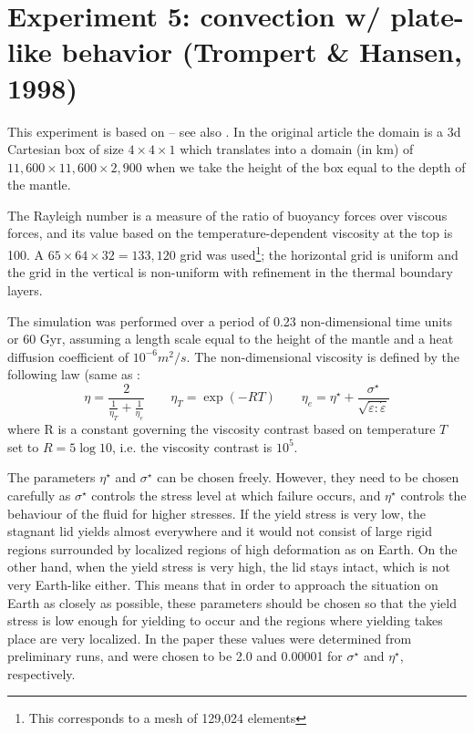 \section{Experiment 5: convection w/ plate-like behavior (Trompert \& Hansen, 1998)}

This experiment is based on \textcite{trha98b} -- see also \textcite{trha98}.
In the original article the domain is a 3d Cartesian box of size $4 \times 4 \times 1$
which translates into a domain (in km) of $11,600 \times  11,600 \times 2,900$ 
when we take the height of the box equal to the depth of the mantle.

The Rayleigh number is a measure of the ratio of buoyancy forces over viscous forces, 
and its value based on the temperature-dependent viscosity at the top is 100. A
$65 \times  64 \times  32 = 133,120$ grid was used\footnote{This corresponds to a
mesh of 129,024 elements}; the horizontal grid is uniform and the grid in the vertical 
is non-uniform with refinement in the thermal boundary layers.

The simulation was performed over a period of 0.23 non-dimensional time units or 60 Gyr, assuming a
length scale equal to the height of the mantle and a heat diffusion coefficient of $10^{-6} m^2/s$.
The non-dimensional viscosity is defined by the following law (same as \cite{tosn15}:
\[
\eta = \frac{2}{\frac{1}{\eta_T} + \frac{1}{\eta_e}}
\qquad
\eta_T = \exp(-RT) 
\qquad
\eta_e=\eta^\star + \frac{\sigma^\star}{\sqrt{\dot{\varepsilon}:\dot{\varepsilon}}}
\]
where R is a constant governing the viscosity contrast based on temperature $T$ 
set to $R=5 \log 10$, i.e. the viscosity contrast is $10^5$.

The parameters $\eta^\star$ and $\sigma^\star$ 
can be chosen freely. However, they need to be chosen carefully as
$\sigma^\star$ controls the stress level at which failure occurs, and $\eta^\star$ controls
the behaviour of the fluid for higher stresses. If the yield stress is very
low, the stagnant lid yields almost everywhere and it would not
consist of large rigid regions surrounded by localized regions of high
deformation as on Earth. On the other hand, when the yield stress is
very high, the lid stays intact, which is not very Earth-like either.
This means that in order to approach the situation on Earth as
closely as possible, these parameters should be chosen so that the
yield stress is low enough for yielding to occur and the regions where
yielding takes place are very localized.
In the paper these values were determined from preliminary runs, and were
chosen to be 2.0 and 0.00001 for $\sigma^\star$ and $\eta^\star$, respectively.

